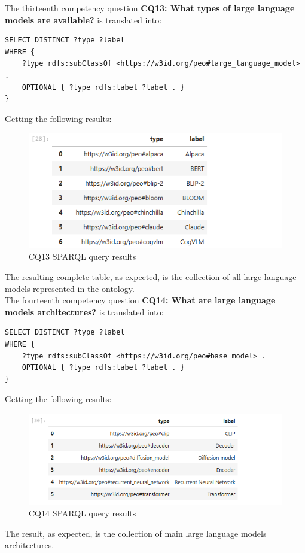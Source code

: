 The thirteenth competency question \textbf{CQ13: What types of large language models are available?} is translated into:
\begin{lstlisting}
SELECT DISTINCT ?type ?label
WHERE {
    ?type rdfs:subClassOf <https://w3id.org/peo#large_language_model> .
    OPTIONAL { ?type rdfs:label ?label . }
}
\end{lstlisting}
Getting the following results:
\begin{figure}[H]
    \centering
    \includegraphics[width=0.9\linewidth]{Figures/fig_59.png}
    \caption{CQ13 SPARQL query results}
    \label{fig:enter-label}
\end{figure}
The resulting complete table, as expected, is the collection of all large language models represented in the ontology.\\

The fourteenth competency question \textbf{CQ14: What are large language models architectures?} is translated into:
\begin{lstlisting}
SELECT DISTINCT ?type ?label
WHERE {
    ?type rdfs:subClassOf <https://w3id.org/peo#base_model> .
    OPTIONAL { ?type rdfs:label ?label . }
}   
\end{lstlisting}
Getting the following results:
\begin{figure}[H]
    \centering
    \includegraphics[width=0.9\linewidth]{Figures/fig_60.png}
    \caption{CQ14 SPARQL query results}
    \label{fig:enter-label}
\end{figure}
The result, as expected, is the collection of main large language models architectures.\\

